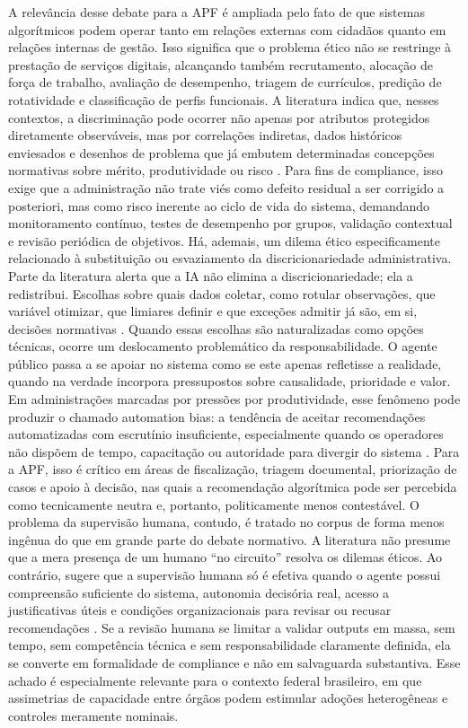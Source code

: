 \documentclass[12pt,a4paper]{article}
\begin{document}
A relevância desse debate para a APF é ampliada pelo fato de que sistemas algorítmicos podem operar tanto em relações externas com cidadãos quanto em relações internas de gestão. Isso significa que o problema ético não se restringe à prestação de serviços digitais, alcançando também recrutamento, alocação de força de trabalho, avaliação de desempenho, triagem de currículos, predição de rotatividade e classificação de perfis funcionais. A literatura indica que, nesses contextos, a discriminação pode ocorrer não apenas por atributos protegidos diretamente observáveis, mas por correlações indiretas, dados históricos enviesados e desenhos de problema que já embutem determinadas concepções normativas sobre mérito, produtividade ou risco \autocite{cho2023human} \autocite{chilunjika2022artificial}. Para fins de compliance, isso exige que a administração não trate viés como defeito residual a ser corrigido a posteriori, mas como risco inerente ao ciclo de vida do sistema, demandando monitoramento contínuo, testes de desempenho por grupos, validação contextual e revisão periódica de objetivos.
Há, ademais, um dilema ético especificamente relacionado à substituição ou esvaziamento da discricionariedade administrativa. Parte da literatura alerta que a IA não elimina a discricionariedade; ela a redistribui. Escolhas sobre quais dados coletar, como rotular observações, que variável otimizar, que limiares definir e que exceções admitir já são, em si, decisões normativas \autocite{criado2024artificial} \autocite{parycek2023artificial}. Quando essas escolhas são naturalizadas como opções técnicas, ocorre um deslocamento problemático da responsabilidade. O agente público passa a se apoiar no sistema como se este apenas refletisse a realidade, quando na verdade incorpora pressupostos sobre causalidade, prioridade e valor. Em administrações marcadas por pressões por produtividade, esse fenômeno pode produzir o chamado automation bias: a tendência de aceitar recomendações automatizadas com escrutínio insuficiente, especialmente quando os operadores não dispõem de tempo, capacitação ou autoridade para divergir do sistema \autocite{pi2021machine} \autocite{madan2022ai}. Para a APF, isso é crítico em áreas de fiscalização, triagem documental, priorização de casos e apoio à decisão, nas quais a recomendação algorítmica pode ser percebida como tecnicamente neutra e, portanto, politicamente menos contestável.
O problema da supervisão humana, contudo, é tratado no corpus de forma menos ingênua do que em grande parte do debate normativo. A literatura não presume que a mera presença de um humano “no circuito” resolva os dilemas éticos. Ao contrário, sugere que a supervisão humana só é efetiva quando o agente possui compreensão suficiente do sistema, autonomia decisória real, acesso a justificativas úteis e condições organizacionais para revisar ou recusar recomendações \autocite{sigfrids2022how} \autocite{mkander2023auditing}. Se a revisão humana se limitar a validar outputs em massa, sem tempo, sem competência técnica e sem responsabilidade claramente definida, ela se converte em formalidade de compliance e não em salvaguarda substantiva. Esse achado é especialmente relevante para o contexto federal brasileiro, em que assimetrias de capacidade entre órgãos podem estimular adoções heterogêneas e controles meramente nominais.
\end{document}
